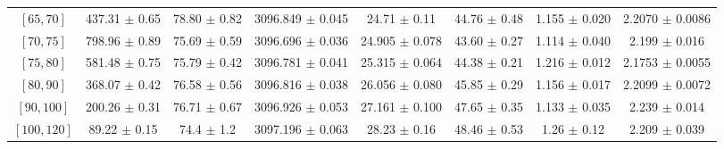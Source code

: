 \begin{tabular}{c||c|c|c|c|c|c|c}
$[65, 70]$ & 437.31 $\pm$ 0.65 & 78.80 $\pm$ 0.82 & 3096.849 $\pm$ 0.045 & 24.71 $\pm$ 0.11 & 44.76 $\pm$ 0.48 & 1.155 $\pm$ 0.020 & 2.2070 $\pm$ 0.0086\\
$[70, 75]$ & 798.96 $\pm$ 0.89 & 75.69 $\pm$ 0.59 & 3096.696 $\pm$ 0.036 & 24.905 $\pm$ 0.078 & 43.60 $\pm$ 0.27 & 1.114 $\pm$ 0.040 & 2.199 $\pm$ 0.016\\
$[75, 80]$ & 581.48 $\pm$ 0.75 & 75.79 $\pm$ 0.42 & 3096.781 $\pm$ 0.041 & 25.315 $\pm$ 0.064 & 44.38 $\pm$ 0.21 & 1.216 $\pm$ 0.012 & 2.1753 $\pm$ 0.0055\\
$[80, 90]$ & 368.07 $\pm$ 0.42 & 76.58 $\pm$ 0.56 & 3096.816 $\pm$ 0.038 & 26.056 $\pm$ 0.080 & 45.85 $\pm$ 0.29 & 1.156 $\pm$ 0.017 & 2.2099 $\pm$ 0.0072\\
$[90, 100]$ & 200.26 $\pm$ 0.31 & 76.71 $\pm$ 0.67 & 3096.926 $\pm$ 0.053 & 27.161 $\pm$ 0.100 & 47.65 $\pm$ 0.35 & 1.133 $\pm$ 0.035 & 2.239 $\pm$ 0.014\\
$[100, 120]$ & 89.22 $\pm$ 0.15 & 74.4 $\pm$ 1.2 & 3097.196 $\pm$ 0.063 & 28.23 $\pm$ 0.16 & 48.46 $\pm$ 0.53 & 1.26 $\pm$ 0.12 & 2.209 $\pm$ 0.039\\
\end{tabular}
